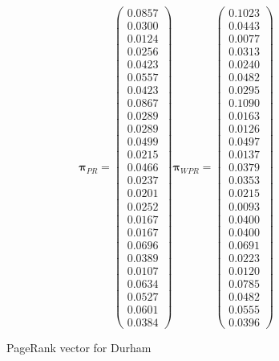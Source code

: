 \documentclass[11pt]{report}
\begin{document}
\begin{appendices}
\begin{figure} [H]
\begin{equation}
\boldsymbol\pi_{PR} = \left(
\begin{array}{c}
0.0857\\
0.0300\\
0.0124\\
0.0256\\
0.0423\\
0.0557\\
0.0423\\
0.0867\\
0.0289\\
0.0289\\
0.0499\\
0.0215\\
0.0466\\
0.0237\\
0.0201\\
0.0252\\
0.0167\\
0.0167\\
0.0696\\
0.0389\\
0.0107\\
0.0634\\
0.0527\\
0.0601\\
0.0384
\end{array}
\right)    
\boldsymbol\pi_{WPR} = \left(
\begin{array}{c}
0.1023 \\
0.0443 \\
0.0077 \\
0.0313 \\
0.0240 \\
0.0482 \\
0.0295 \\
0.1090 \\
0.0163 \\
0.0126 \\
0.0497 \\
0.0137 \\
0.0379 \\
0.0353 \\
0.0215 \\
0.0093 \\
0.0400 \\
0.0400 \\
0.0691 \\
0.0223 \\
0.0120 \\
0.0785 \\
0.0482 \\
0.0555 \\
0.0396 
\end{array}
\right)
\end{equation} 
\caption{PageRank vector for Durham}
\end{figure}  \label{DPR}


\end{appendices}
\end{document}
